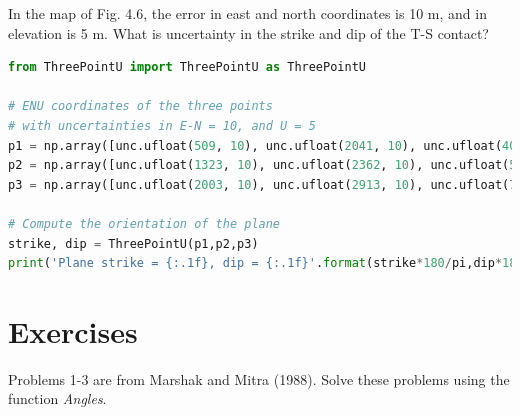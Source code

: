 \documentclass[a4paper , 12pt]{book}
\begin{document}
In the map of Fig. 4.6, the error in east and north coordinates is 10 m, and in elevation is 5 m. What is uncertainty in the strike and dip of the T-S contact? 

\begin{center}
\begin{lstlisting}[language=Python, frame=single]
from ThreePointU import ThreePointU as ThreePointU

# ENU coordinates of the three points
# with uncertainties in E-N = 10, and U = 5
p1 = np.array([unc.ufloat(509, 10), unc.ufloat(2041, 10), unc.ufloat(400, 5)])
p2 = np.array([unc.ufloat(1323, 10), unc.ufloat(2362, 10), unc.ufloat(500, 5)])
p3 = np.array([unc.ufloat(2003, 10), unc.ufloat(2913, 10), unc.ufloat(700, 5)])

# Compute the orientation of the plane
strike, dip = ThreePointU(p1,p2,p3)
print('Plane strike = {:.1f}, dip = {:.1f}'.format(strike*180/pi,dip*180/pi))
\end{lstlisting}
\end{center}

\section{Exercises} \label{exercises4}

Problems 1-3 are from Marshak and Mitra (1988). Solve these problems using the function \textit{Angles}.
\end{document}
